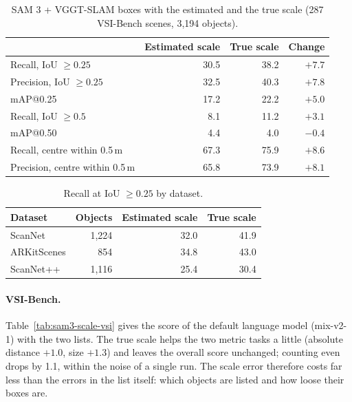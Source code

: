 \begin{table}[t]
\centering
\caption{SAM 3 + VGGT-SLAM boxes with the estimated and the true scale (287 VSI-Bench scenes, 3,194 objects).}
\label{tab:sam3-scale-3d}
\begin{tabular}{lrrr}
\toprule
 & Estimated scale & True scale & Change \\
\midrule
Recall, IoU $\geq 0.25$             & 30.5 & 38.2 & $+7.7$ \\
Precision, IoU $\geq 0.25$          & 32.5 & 40.3 & $+7.8$ \\
mAP@0.25                            & 17.2 & 22.2 & $+5.0$ \\
Recall, IoU $\geq 0.5$              &  8.1 & 11.2 & $+3.1$ \\
mAP@0.50                            &  4.4 &  4.0 & $-0.4$ \\
Recall, centre within 0.5\,m        & 67.3 & 75.9 & $+8.6$ \\
Precision, centre within 0.5\,m     & 65.8 & 73.9 & $+8.1$ \\
\bottomrule
\end{tabular}
\end{table}

\begin{table}[t]
\centering
\caption{Recall at IoU $\geq 0.25$ by dataset.}
\label{tab:sam3-scale-ds}
\begin{tabular}{lrrr}
\toprule
Dataset & Objects & Estimated scale & True scale \\
\midrule
ScanNet     & 1,224 & 32.0 & 41.9 \\
ARKitScenes &   854 & 34.8 & 43.0 \\
ScanNet++   & 1,116 & 25.4 & 30.4 \\
\bottomrule
\end{tabular}
\end{table}

\paragraph{VSI-Bench.} Table~\ref{tab:sam3-scale-vsi} gives the score of the default language model (mix-v2-1) with
the two lists. The true scale helps the two metric tasks a little (absolute distance $+1.0$, size $+1.3$) and leaves
the overall score unchanged; counting even drops by 1.1, within the noise of a single run. The scale error therefore
costs far less than the errors in the list itself: which objects are listed and how loose their boxes are.

